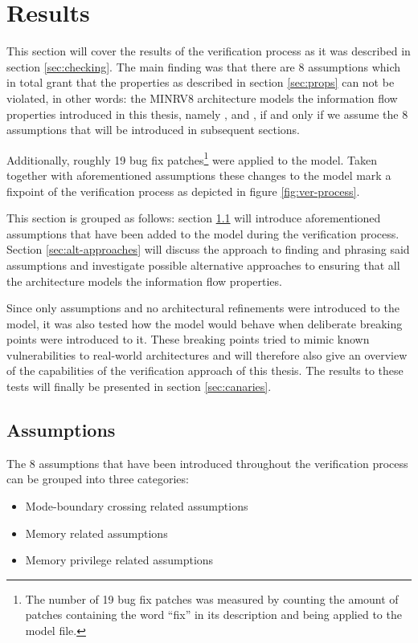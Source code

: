 
\section{Results}

This section will cover the results of the verification process as it was described in section \ref{sec:checking}.
The main finding was that there are 8 assumptions which in total grant that the properties as described in section \ref{sec:props} can not be violated, in other words: the MINRV8 architecture models the information flow properties introduced in this thesis, namely ,  and , if and only if we assume the 8 assumptions that will be introduced in subsequent sections.

Additionally, roughly 19 bug fix patches\footnote{%
    The number of 19 bug fix patches was measured by counting the amount of patches containing the word \enquote{fix} in its description and being applied to the model file.
} were applied to the model.
Taken together with aforementioned assumptions these changes to the model mark a fixpoint of the verification process as depicted in figure \ref{fig:ver-process}.

This section is grouped as follows: section \ref{sec:assumptions} will introduce aforementioned assumptions that have been added to the model during the verification process.
Section \ref{sec:alt-approaches} will discuss the approach to finding and phrasing said assumptions and investigate possible alternative approaches to ensuring that all the architecture models the information flow properties.

Since only assumptions and no architectural refinements were introduced to the model, it was also tested how the model would behave when deliberate breaking points were introduced to it.
These breaking points tried to mimic known vulnerabilities to real-world architectures and will therefore also give an overview of the capabilities of the verification approach of this thesis.
The results to these tests will finally be presented in section \ref{sec:canaries}.

\subsection{Assumptions}
\label{sec:assumptions}

The 8 assumptions that have been introduced throughout the verification process can be grouped into three categories:
\begin{itemize}
    \item Mode-boundary crossing related assumptions
    \item Memory related assumptions
    \item Memory privilege related assumptions
\end{itemize}

